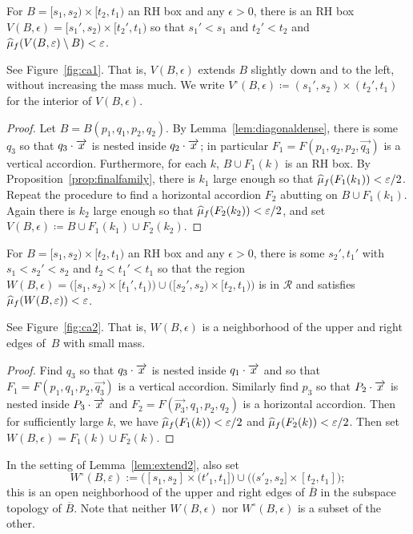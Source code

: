 \begin{lemma}\label{lem:extend1}
  For $B = [s_1,s_2)\times [t_2,t_1)$ an RH box and any
  $\epsilon > 0$, there is an RH box
  $V(B,\epsilon) = [s_1',s_2) \times [t_2',t_1)$ so that $s_1' < s_1$
  and $t_2' < t_2$ and
  $\widehat{\mu}_f(V(B,\varepsilon) \setminus B) < \varepsilon$.
\end{lemma}
See Figure~\ref{fig:ca1}. That is, $V(B,\epsilon)$ extends $B$ slightly down and to the left,
without increasing the mass much. We write $V^\circ(B,\epsilon)\coloneqq (s_1',s_2)\times(t_2',t_1)$ for the interior of $V(B,\epsilon)$.

\begin{proof}
  Let $B = B(p_1,q_1,p_2,q_2)$. By Lemma~\ref{lem:diagonaldense}, there is some $q_3$ so that $q_3 \cdot \overrightarrow{x}$ is nested inside $q_2 \cdot \overrightarrow{x}$; in particular $F_1 = F(p_1,q_2,p_2,\vec{q_3})$ is a vertical accordion. Furthermore, for each $k$, $B \cup F_1(k)$ is an RH box.  By Proposition~\ref{prop:finalfamily}, there is $k_1$ large enough so that $\widehat{\mu}_f(F_1(k_1))<\varepsilon/2$. Repeat the procedure to find a horizontal accordion $F_2$ abutting on $B \cup F_1(k_1)$. Again there is $k_2$ large enough so that $\widehat{\mu}_f(F_2(k_2)) < \varepsilon/2$, and set $V(B,\epsilon) \coloneqq B \cup F_1(k_1) \cup F_2(k_2)$.
\end{proof}

\begin{lemma}\label{lem:extend2}
  For $B = [s_1,s_2) \times [t_2,t_1)$ an RH box and any $\epsilon > 0$, there is some $s_2',t_1'$ with $s_1 < s_2' < s_2$ and $t_2 < t_1' < t_1$ so that the region $W(B,\epsilon) = \bigl([s_1,s_2) \times [t_1',t_1)\bigr) \cup \bigl([s_2',s_2) \times [t_2,t_1)\bigr)$ is in $\mathcal{R}$ and satisfies $\widehat{\mu}_f(W(B,\varepsilon)) < \varepsilon$.
\end{lemma}
See Figure~\ref{fig:ca2}. That is, $W(B,\epsilon)$ is a neighborhood of the upper and right
edges of~$B$ with small mass.

\begin{proof}
  Find $q_3$ so that $q_3 \cdot \overrightarrow{x}$ is nested inside $q_1 \cdot \overrightarrow{x}$ and so that $F_1 = F(p_1,q_1,p_2,\vec{q_3})$ is a vertical accordion. Similarly find $p_3$ so that $P_2 \cdot \overrightarrow{x}$ is nested inside $P_3 \cdot \overrightarrow{x}$ and $F_2 = F(\vec{p_3},q_1,p_2,q_2)$ is a horizontal accordion. Then for sufficiently large $k$, we have $\widehat{\mu}_f(F_1(k)) < \varepsilon/2$ and $\widehat{\mu}_f(F_2(k)) < \varepsilon/2$. Then set $W(B,\epsilon) = F_1(k) \cup F_2(k)$.
\end{proof}
In the setting of Lemma~\ref{lem:extend2}, also set
\[
W^\circ(B,\varepsilon):=
\bigl([s_1,s_2]\times(t'_1,t_1]\bigr)
\cup
\bigl((s'_2,s_2]\times[t_2,t_1]\bigr);
\]
this is an open neighborhood of the upper and right edges of
$\overline{B}$ in the subspace topology of $\overline{B}$. Note that
neither $W(B,\epsilon)$ nor $W^\circ(B,\epsilon)$ is a subset of the
other.

